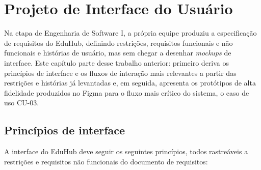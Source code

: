 \chapter{Projeto de Interface do Usuário}

Na etapa de Engenharia de Software I, a própria equipe produziu a
especificação de requisitos do EduHub, definindo restrições, requisitos
funcionais e não funcionais e histórias de usuário, mas sem chegar a
desenhar \textit{mockups} de interface. Este
capítulo parte desse trabalho anterior: primeiro deriva os princípios de
interface e os fluxos de interação mais relevantes a partir das restrições
e histórias já levantadas e, em seguida, apresenta os protótipos de alta
fidelidade produzidos no Figma para o fluxo mais crítico do sistema, o
caso de uso CU-03.

\section{Princípios de interface}

A interface do EduHub deve seguir os seguintes princípios, todos rastreáveis a
restrições e requisitos não funcionais do documento de requisitos:

